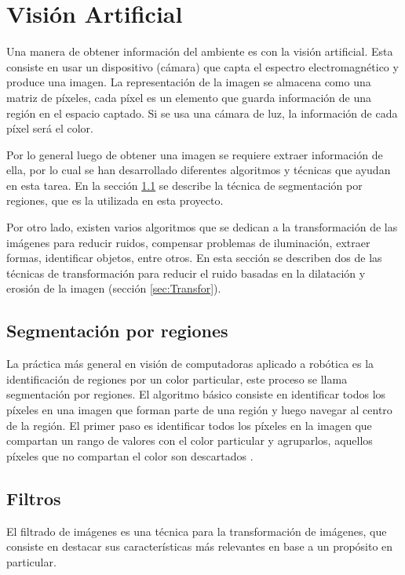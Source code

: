 \section{Visión Artificial} \label{sect:Vision_Artificial}

Una manera de obtener información del ambiente es con la visión artificial. Esta consiste en usar un dispositivo (cámara) que
capta el espectro electromagnético y produce una imagen. La representación de la imagen se almacena como una matriz de píxeles,
cada píxel es un elemento que guarda información de una región en el espacio captado. Si se usa una cámara de luz, la información
de cada píxel será el color. \cite{AiRobotics}  

Por lo general luego de obtener una imagen se requiere extraer información de ella, por lo cual se han desarrollado diferentes algoritmos y t\'ecnicas que ayudan en esta tarea. En la sección \ref{sec:Segmentacion} se describe la t\'ecnica de segmentaci\'on por regiones, que es la utilizada en esta proyecto. 

Por otro lado, existen varios algoritmos que se dedican a la transformación de las imágenes para reducir
ruidos, compensar problemas de iluminación, extraer formas, identificar objetos, entre otros. En esta sección se describen dos de las técnicas de transformación para reducir el ruido basadas en la dilatación y erosión de la imagen (secci\'on \ref{sec:Transfor}). 
 
\subsection{Segmentaci\'on por regiones}\label{sec:Segmentacion}

La pr\'actica m\'as general en visi\'on de computadoras aplicado a rob\'otica es la identificaci\'on de regiones por un color particular, este proceso se llama segmentaci\'on por regiones. El algoritmo b\'asico consiste en identificar todos los p\'ixeles en una imagen que forman parte de una regi\'on y luego navegar al centro de la regi\'on. El primer paso es identificar todos los p\'ixeles en la imagen que compartan un rango de valores con el color particular y agruparlos, aquellos p\'ixeles que no compartan el color son descartados \cite{BookOpenCv}. 

\subsection{Filtros}
El filtrado de imágenes es una técnica para la transformación de imágenes, que consiste en destacar  sus características más relevantes en base a un propósito en particular. 

